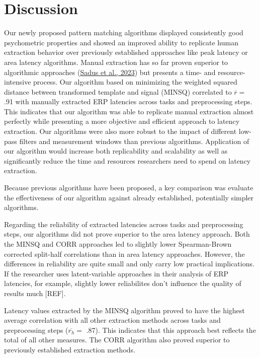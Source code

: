 \documentclass[
  man]{apa7}
\begin{document}
\hypertarget{discussion}{%
\section{Discussion}\label{discussion}}

Our newly proposed pattern matching algorithms displayed consistently good psychometric properties and showed an improved ability to replicate human extraction behavior over previously established approaches like peak latency or area latency algorithms. Manual extraction has so far proven superior to algorithmic approaches (\protect\hyperlink{ref-sadus2023multiverse}{Sadus et al., 2023}) but presents a time- and resource-intensive process. Our algorithm based on minimizing the weighted squared distance between transformed template and signal (MINSQ) correlated to \(\overline{r} =\) .91 with manually extracted ERP latencies across tasks and preprocessing steps. This indicates that our algorithm was able to replicate manual extraction almost perfectly while presenting a more objective and efficient approach to latency extraction. Our algorithms were also more robust to the impact of different low-pass filters and measurement windows than previous algorithms. Application of our algorithm would increase both replicability and scalability as well as significantly reduce the time and resources researchers need to spend on latency extraction.

Because previous algorithms have been proposed, a key comparison was evaluate the effectiveness of our algorithm against already established, potentially simpler algorithms.

Regarding the reliability of extracted latencies across tasks and preprocessing steps, our algorithms did not prove superior to the area latency approach. Both the MINSQ and CORR approaches led to slightly lower Spearman-Brown corrected split-half correlations than in area latency approaches. However, the differences in reliability are quite small and only carry low practical implications. If the researcher uses latent-variable approaches in their analysis of ERP latencies, for example, slightly lower reliabilites don't influence the quality of results much {[}REF{]}.

Latency values extracted by the MINSQ algorithm proved to have the highest average correlation with all other extraction methods across tasks and preprocessing steps (\(\overline{r_{h}} =\) .87). This indicates that this approach best reflects the total of all other measures. The CORR algorithm also proved superior to previously established extraction methods.
\end{document}
